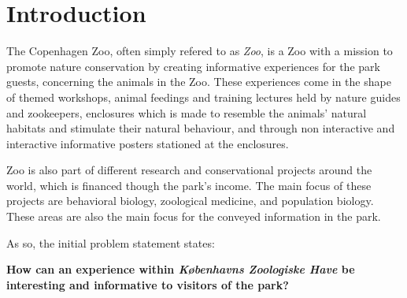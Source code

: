 \chapter{Introduction}

The Copenhagen Zoo, often simply refered to as \textit{Zoo}, is a Zoo with a mission to promote nature conservation by creating informative experiences for the park guests, concerning the animals in the Zoo. These experiences come in the shape of themed workshops, animal feedings and training lectures held by nature guides and zookeepers, enclosures which is made to resemble the animals' natural habitats and stimulate their natural behaviour, and through non interactive and interactive informative posters stationed at the enclosures. 

Zoo is also part of different research and conservational projects around the world, which is financed though the park's income. The main focus of these projects are behavioral biology, zoological medicine, and population biology. These areas are also the main focus for the conveyed information in the park.




As so, the initial problem statement states: 

\textbf{How can an experience within \textit{Københavns Zoologiske Have} be interesting and informative to visitors of the park?}   










